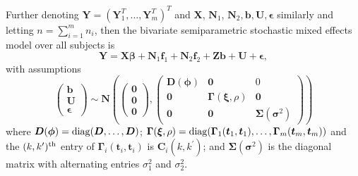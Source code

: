 \documentclass[article,lineno]{biometrika}
\begin{document}
Further denoting $\boldsymbol  Y = (\boldsymbol Y_1^T, \dots, \boldsymbol Y_m^T)^T$ and $\boldsymbol  X$, $\boldsymbol  N_1$, $\boldsymbol  N_2, \boldsymbol b, \boldsymbol U, \boldsymbol \epsilon$ similarly and letting $n = \sum_{i = 1}^m n_i$, then  the bivariate semiparametric stochastic mixed effects model over all subjects is 
\begin{equation} \label{propM}
\boldsymbol Y 
=
\boldsymbol{X}\boldsymbol{\beta} 
+ \boldsymbol N_1 \boldsymbol f_1 
+ \boldsymbol N_2 \boldsymbol f_2 
+ \boldsymbol{Z}\boldsymbol{b}
+ \boldsymbol U 
+ \boldsymbol \epsilon,
\end{equation}
with assumptions 
\[
 \begin{pmatrix}
  \boldsymbol b \\
  \boldsymbol U  \\
 \boldsymbol \epsilon
 \end{pmatrix}
 \sim 
 \boldsymbol N \left(
 \begin{pmatrix}
\boldsymbol 0 \\
\boldsymbol 0 \\
 \boldsymbol 0 
 \end{pmatrix},
  \begin{pmatrix}
  \boldsymbol D(\boldsymbol \phi) &  \boldsymbol 0 & 0 \\
  \boldsymbol 0 & \boldsymbol \Gamma (\boldsymbol \xi, \rho) & \boldsymbol 0 \\
 \boldsymbol 0 & \boldsymbol 0 &  \boldsymbol \Sigma (\boldsymbol \sigma^2) 
 \end{pmatrix}
 \right) 
\]
where 
$\boldsymbol D (\boldsymbol \phi) = {\rm diag} (\boldsymbol D, \dots, \boldsymbol D)$; 
$\boldsymbol \Gamma (\boldsymbol \xi, \rho) = {\rm diag} (  \boldsymbol \Gamma_1 (\boldsymbol t_1, \boldsymbol t_1), \dots,   \boldsymbol \Gamma_m(\boldsymbol t_m, \boldsymbol t_m))$
and the $(k, k^\prime)^{\rm th}$ entry of $ \boldsymbol \Gamma_i(\boldsymbol t_i, \boldsymbol t_i)$ is $\boldsymbol C_i(k, k^\prime)$;
and $\bm \Sigma(\bm \sigma^2)$ is the diagonal matrix with alternating entries $\sigma^2_1$ and $\sigma^2_2$. 
\end{document}
